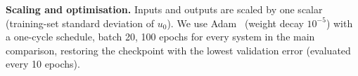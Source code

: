 \textbf{Scaling and optimisation.} Inputs and outputs are scaled by one scalar (training-set standard deviation of $u_0$). We use Adam~\cite{kingma2014adam} (weight decay $10^{-5}$) with a one-cycle schedule, batch 20, 100 epochs for every system in the main comparison, restoring the checkpoint with the lowest validation error (evaluated every 10 epochs).
